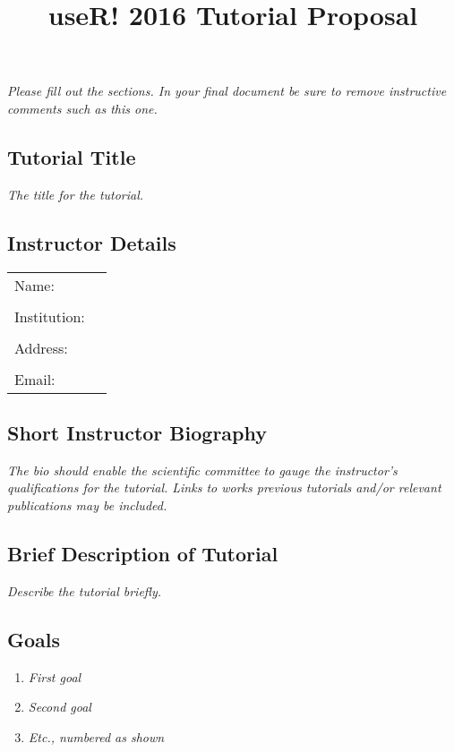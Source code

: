 \documentclass[]{article}
\title{useR! 2016 Tutorial Proposal}
\author{}
\date{}
\providecommand{\tightlist}{%
  \setlength{\itemsep}{0pt}\setlength{\parskip}{0pt}}
\begin{document}
\maketitle

\emph{Please fill out the sections. In your final document be sure to
remove instructive comments such as this one.}

\subsection{Tutorial Title}\label{tutorial-title}

\emph{The title for the tutorial.}

\subsection{Instructor Details}\label{instructor-details}

\begin{longtable}[c]{@{}ll@{}}
\toprule
Name: &\tabularnewline
&\tabularnewline
Institution: &\tabularnewline
&\tabularnewline
Address: &\tabularnewline
&\tabularnewline
Email: &\tabularnewline
\bottomrule
\end{longtable}

\subsection{Short Instructor
Biography}\label{short-instructor-biography}

\emph{The bio should enable the scientific committee to gauge the
instructor's qualifications for the tutorial. Links to works previous
tutorials and/or relevant publications may be included.}

\subsection{Brief Description of
Tutorial}\label{brief-description-of-tutorial}

\emph{Describe the tutorial briefly.}

\subsection{Goals}\label{goals}

\begin{enumerate}
\def\labelenumi{\arabic{enumi}.}
\tightlist
\item
  \emph{First goal}
\item
  \emph{Second goal}
\item
  \emph{Etc., numbered as shown}
\end{enumerate}
\end{document}
